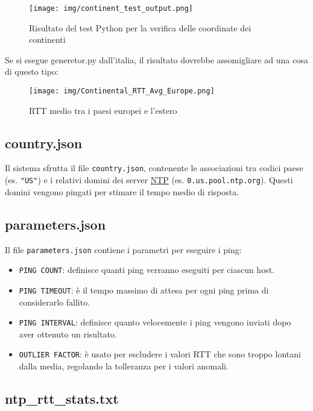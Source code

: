\begin{figure}[H]
  \centering
  \texttt{[image: img/continent\_test\_output.png]}
  \caption{Risultato del test Python per la verifica delle coordinate dei continenti}
\end{figure}

Se si esegue generetor.py dall'italia, il risultato dovrebbe assomigliare ad una cosa di questo tipo:

\begin{figure}[hp!]
  \centering
  \texttt{[image: img/Continental\_RTT\_Avg\_Europe.png]}
  \caption{RTT medio tra i paesi europei e l'estero}
\end{figure}
\clearpage
\subsection{country.json}

Il sistema sfrutta il file \texttt{country.json}, contenente le associazioni tra codici paese (es. \texttt{"US"}) e i relativi domini dei server \href{https://www.ntppool.org/it/}{NTP} (es. \texttt{0.us.pool.ntp.org}). Questi domini vengono pingati per stimare il tempo medio di risposta.\\

\subsection{parameters.json}

Il file \texttt{parameters.json} contiene i parametri per eseguire i ping:

\begin{itemize}

  \item \texttt {PING COUNT}: definisce quanti ping verranno eseguiti per ciascun host.
  \item \texttt {PING TIMEOUT}: è il tempo massimo di attesa per ogni ping prima di considerarlo fallito.
  \item \texttt {PING INTERVAL}: definisce quanto velocemente i ping vengono inviati dopo aver ottenuto un risultato.
  \item \texttt {OUTLIER FACTOR}: è usato per escludere i valori RTT che sono troppo lontani dalla media, regolando la tolleranza per i valori anomali.
  
\end{itemize}

\subsection{ntp\_rtt\_stats.txt}

